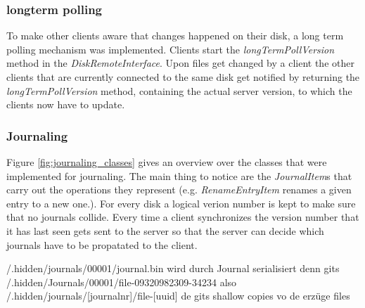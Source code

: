 \subsubsection{longterm polling}
To make other clients aware that changes happened on their disk, a long term
polling mechanism was implemented. Clients start the
\textit{longTermPollVersion} method in the \textit{DiskRemoteInterface}. Upon
files get changed by a client the other clients that are currently connected to
the same disk get notified by returning the \textit{longTermPollVersion} method,
containing the actual server version, to which the clients now have to update.

\subsubsection{Journaling}
Figure \ref{fig:journaling_classes} gives an overview over the classes that
were implemented for journaling. The main thing to notice are the
\textit{JournalItem}s that carry out the operations they represent (e.g.
\textit{RenameEntryItem} renames a given entry to a new one.). For every disk a
logical verion number is kept to make sure that no journals collide. Every time
a client synchronizes the version number that it has last seen gets sent to the
server so that the server can decide which journals have to be propatated to the
client.

 /.hidden/journals/00001/journal.bin
wird durch Journal serialisiert
denn gits /.hidden/Journals/00001/file-09320982309-34234
also /.hidden/journals/[journalnr]/file-[uuid]
de gits shallow copies vo de erzüge files






